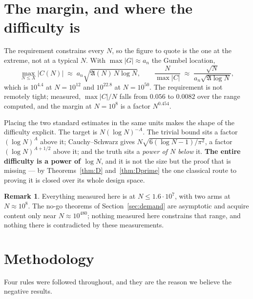 \documentclass[11pt,a4paper]{article}
\theoremstyle{plain}
\theoremstyle{definition}
\newtheorem{remark}[theorem]{Remark}
\newcommand{\AAA}{\mathfrak{A}}
\begin{document}
\section{The margin, and where the difficulty is}

The requirement constrains every $N$, so the figure to quote is the one
at the extreme, not at a typical $N$. With $\max|G|\approx a_n$ the
Gumbel location,
\[
  \max_{N\le X}|C(N)| \;\approx\; a_n\sqrt{\AAA(N)\,N\log N},
  \qquad
  \frac{N}{\max|C|}\;\approx\;
  \frac{\sqrt N}{a_n\sqrt{\AAA\log N}},
\]
which is $10^{4.4}$ at $N=10^{12}$ and $10^{22.8}$ at $N=10^{50}$. The
requirement is not remotely tight; measured, $\max|C|/N$ falls from
$0.056$ to $0.0082$ over the range computed, and the margin at
$N=10^8$ is a factor $N^{0.454}$.

Placing the two standard estimates in the same units makes the shape of
the difficulty explicit. The target is $N(\log N)^{-A}$. The trivial
bound sits a factor $(\log N)^{A}$ above it; Cauchy--Schwarz gives
$N\sqrt{6(\log N-1)/\pi^2}$, a factor $(\log N)^{A+1/2}$ above it; and
the truth sits a \emph{power of $N$ below} it. \textbf{The entire
difficulty is a power of $\log N$}, and it is not the size but the
proof that is missing --- by Theorems~\ref{thm:D} and~\ref{thm:Dprime}
the one classical route to proving it is closed over its whole design
space.

\begin{remark}
Everything measured here is at $N\le1.6\cdot10^7$, with two arms at
$N\approx10^8$. The no-go theorems of Section~\ref{sec:demand} are
asymptotic and acquire content only near $N\approx10^{480}$; nothing
measured here constrains that range, and nothing there is contradicted
by these measurements.
\end{remark}

\section{Methodology}

Four rules were followed throughout, and they are the reason we believe
the negative results.
\end{document}
